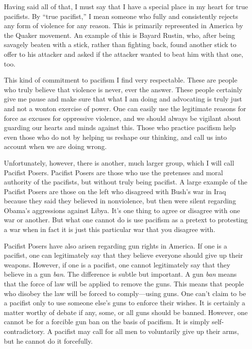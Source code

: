 Having said all of
that, I must say that I have a special place in my heart for true
pacifists. By “true pacifist,” I mean someone who fully and
consistently rejects any form of violence for any reason. This is
primarily represented in America by the Quaker movement. An example of
this is Bayard Rustin, who, after being savagely beaten with a stick,
rather than fighting back, found another stick to offer to his attacker
and asked if the attacker wanted to beat him with that one, too. 

This kind of commitment to pacifism I find very respectable. These are
people who truly believe that violence is never, ever the answer. These
people certainly give me pause and make sure that what I am doing and
advocating is truly just and not a wonton exercise of power. One can
easily use the legitimate reasons for force as excuses for oppressive
violence, and we should always be vigilant about guarding our hearts
and minds against this. Those who practice pacifism help even those who
do not by helping us reshape our thinking, and call us into account
when we are doing wrong.

Unfortunately, however, there is another, much larger group, which I
will call Pacifist Posers. Pacifist Posers are those who use the
pretenses and moral authority of the pacifists, but without truly being
pacifist. A large example of the Pacifist Posers are those on the left
who disagreed with Bush’s war in Iraq because they said they believed
in nonviolence, but then were silent regarding Obama’s aggressions
against Libya. It’s one thing to agree or disagree with one war or
another. But what one cannot do is use pacifism as a pretext to
protesting a war when in fact it is just this particular war that you
disagree with.

Pacifist Posers have also arisen regarding gun rights in America. If one
is a pacifist, one can legitimately say that they believe everyone
should give up their weapons. However, if one is a pacifist, one cannot
legitimately say that they believe in a gun \textit{ban}. The
difference is subtle but important. A gun \textit{ban} means that the
force of law will be applied to remove the guns. This means that people
who disobey the law will be forced to comply—using guns. One can’t
claim to be a pacifist only to use someone else’s guns to enforce their
wishes. It is certainly a matter worthy of debate if any, some, or all
guns should be banned. However, one cannot be for a forcible gun ban on
the basis of pacifism. It is simply self-contradictory. A pacifist may
call for all men to voluntarily give up their arms, but he cannot do it
forcefully.

